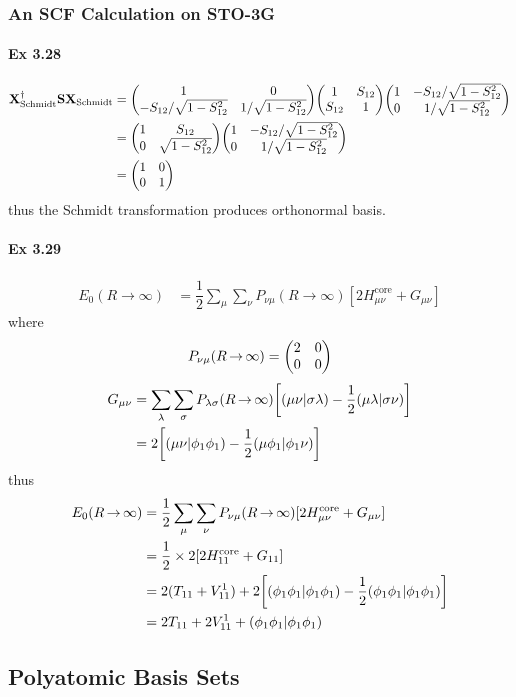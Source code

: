\documentclass[a4paper]{article}
\DeclareMathOperator{\ra}{\rightarrow}
\DeclareMathOperator{\core}{\mathrm{core}}
\newcommand{\ex}[1]{\paragraph{Ex #1}}
\numberwithin{equation}{subsection}
\begin{document}
\subsubsection{An SCF Calculation on STO-3G }
\ex{3.28}
\begin{align}
\vb{X}^\dagger_{\text{Schmidt}} \vb{S} \vb{X}_{\text{Schmidt}} &= \mqty(1 & 0 \\ -S_{12}/\sqrt{1-S_{12}^2} & 1/\sqrt{1-S_{12}^2}) 
\mqty(1 & S_{12} \\ S_{12} & 1) 
\mqty(1 & -S_{12}/\sqrt{1-S_{12}^2}\\ 0 & 1/\sqrt{1-S_{12}^2}) \notag\\
&= \mqty(1 & S_{12} \\ 0 & \sqrt{1-S_{12}^2}) 
\mqty(1 & -S_{12}/\sqrt{1-S_{12}^2}\\ 0 & 1/\sqrt{1-S_{12}^2}) \notag\\
&= \mqty(1 & 0\\ 0 & 1)
\end{align}
thus the Schmidt transformation produces orthonormal basis.

\ex{3.29}
\begin{align}
E_0(R\ra \infty) &= \dfrac{1}{2}\sum_\mu\sum_\nu P_{\nu\mu}(R\ra \infty) [2H_{\mu\nu}^{\core} + G_{\mu\nu}] 
\end{align}
where
\begin{equation}\label{key}
P_{\nu\mu}(R\ra \infty) = \mqty( 2 & 0\\ 0 & 0)
\end{equation}
\begin{align}\label{key}
G_{\mu\nu} &= \sum_\lambda\sum_\sigma P_{\lambda\sigma}(R\ra\infty) \qty[(\mu\nu|\sigma\lambda) - \dfrac{1}{2}(\mu\lambda|\sigma\nu)] \notag\\
&= 2\qty[(\mu\nu|\phi_1\phi_1) - \dfrac{1}{2}(\mu\phi_1|\phi_1\nu)]
\end{align}
thus
\begin{align}
E_0(R\ra \infty) &= \dfrac{1}{2}\sum_\mu\sum_\nu P_{\nu\mu}(R\ra \infty) [2H_{\mu\nu}^{\core} + G_{\mu\nu}] \notag\\
&= \dfrac{1}{2}\times 2[2H_{11}^{\core} + G_{11}] \notag\\
&= 2(T_{11} + V^1_{11}) + 2\qty[(\phi_1\phi_1|\phi_1\phi_1) - \dfrac{1}{2}(\phi_1\phi_1|\phi_1\phi_1)] \notag\\
&= 2T_{11} + 2V^1_{11} + (\phi_1\phi_1|\phi_1\phi_1) 
\end{align}

\subsection{Polyatomic Basis Sets}
\end{document}
